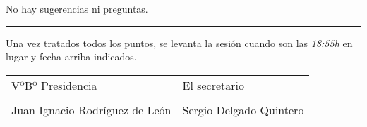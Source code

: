 \documentclass[a4paper,12pt]{article}
\begin{document}
No hay sugerencias ni preguntas.


\vspace{1cm}
\hrule
\vspace{3mm}

Una vez tratados todos los puntos, se levanta la sesión cuando son las \textit{18:55h} en lugar y fecha arriba indicados.

\vspace{1cm}

\begin{table}[h]
    \begin{tabular}{p{9cm}p{9cm}}
        VºBº Presidencia & El secretario \\
        \vspace{3cm} & \vspace{3cm} \\
        Juan Ignacio Rodríguez de León & Sergio Delgado Quintero \\
    \end{tabular}
\end{table}
\end{document}
